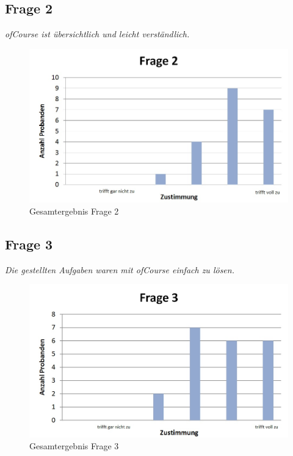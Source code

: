 \subsection{Frage 2}
\begin{center}
	{\it ofCourse ist übersichtlich und leicht verständlich.}
\end{center}
\begin{figure}[h]
\centering
\includegraphics[width=0.7\linewidth]{img/Frage2}
\caption{Gesamtergebnis Frage 2}
\label{fig:Frage2}
\end{figure}


\subsection{Frage 3}
\begin{center}
	{\it Die gestellten Aufgaben waren mit ofCourse einfach zu lösen.}
\end{center}
\begin{figure}[h]
\centering
\includegraphics[width=0.7\linewidth]{img/Frage3}
\caption{Gesamtergebnis Frage 3}
\label{fig:Frage3}
\end{figure}

